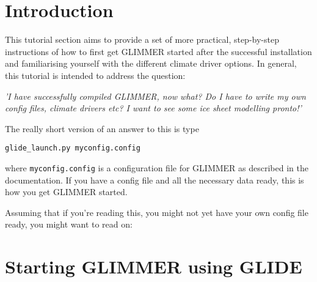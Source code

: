 \section{Introduction}
This tutorial section aims to provide a set of more practical, step-by-step
instructions of how to first get GLIMMER started after the successful
installation and familiarising yourself with the different climate driver
options. In general, this tutorial is intended to address the question:

\emph{'I have successfully compiled GLIMMER, now what? Do I have to write my
own config files, climate drivers etc? I want to see some ice sheet modelling
pronto!'}

The really short version of an answer to this is type
\begin{verbatim}
glide_launch.py myconfig.config
\end{verbatim}
where \texttt{myconfig.config} is a configuration file for GLIMMER as described
in the documentation. If you have a config file and all the necessary data
ready, this is how you get GLIMMER started.


Assuming that if you're reading this, you might not yet have your own config
file ready, you might want to read on:

\section{Starting GLIMMER using GLIDE}
